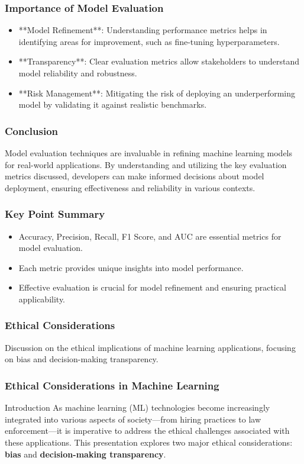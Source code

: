\documentclass{beamer}
\begin{document}
\begin{frame}[fragile]
    \frametitle{Importance of Model Evaluation}
    \begin{itemize}
        \item **Model Refinement**: Understanding performance metrics helps in identifying areas for improvement, such as fine-tuning hyperparameters.
        \item **Transparency**: Clear evaluation metrics allow stakeholders to understand model reliability and robustness.
        \item **Risk Management**: Mitigating the risk of deploying an underperforming model by validating it against realistic benchmarks.
    \end{itemize}
\end{frame}

\begin{frame}[fragile]
    \frametitle{Conclusion}
    Model evaluation techniques are invaluable in refining machine learning models for real-world applications. By understanding and utilizing the key evaluation metrics discussed, developers can make informed decisions about model deployment, ensuring effectiveness and reliability in various contexts.
\end{frame}

\begin{frame}[fragile]
    \frametitle{Key Point Summary}
    \begin{itemize}
        \item Accuracy, Precision, Recall, F1 Score, and AUC are essential metrics for model evaluation.
        \item Each metric provides unique insights into model performance.
        \item Effective evaluation is crucial for model refinement and ensuring practical applicability.
    \end{itemize}
\end{frame}

\begin{frame}[fragile]
    \frametitle{Ethical Considerations}
    Discussion on the ethical implications of machine learning applications, focusing on bias and decision-making transparency.
\end{frame}

\begin{frame}[fragile]
    \frametitle{Ethical Considerations in Machine Learning}
    \begin{block}{Introduction}
        As machine learning (ML) technologies become increasingly integrated into various aspects of society—from hiring practices to law enforcement—it is imperative to address the ethical challenges associated with these applications. This presentation explores two major ethical considerations: \textbf{bias} and \textbf{decision-making transparency}.
    \end{block}
\end{frame}
\end{document}
